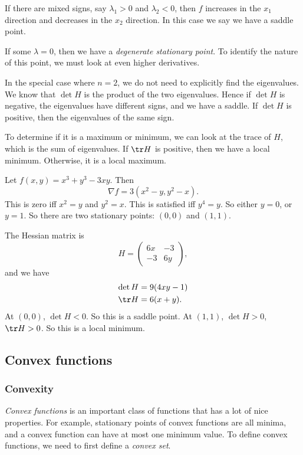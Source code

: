 \documentclass[a4paper]{article}
\begin{document}
If there are mixed signs, say $\lambda_1 > 0$ and $\lambda_2 < 0$, then $f$ increases in the $x_1$ direction and decreases in the $x_2$ direction. In this case we say we have a saddle point.

If some $\lambda = 0$, then we have a \emph{degenerate stationary point}. To identify the nature of this point, we must look at even higher derivatives.

In the special case where $n = 2$, we do not need to explicitly find the eigenvalues. We know that $\det H$ is the product of the two eigenvalues. Hence if $\det H$ is negative, the eigenvalues have different signs, and we have a saddle. If $\det H$ is positive, then the eigenvalues of the same sign.

To determine if it is a maximum or minimum, we can look at the trace of $H$, which is the sum of eigenvalues. If $\tr H$ is positive, then we have a local minimum. Otherwise, it is a local maximum.

\begin{eg}
  Let $f(x, y) = x^3 + y^3 - 3xy$. Then
  \[
    \nabla f = 3(x^2 - y, y^2 - x).
  \]
  This is zero iff $x^2 = y$ and $y^2 = x$. This is satisfied iff $y^4 = y$. So either $y = 0$, or $y = 1$. So there are two stationary points: $(0, 0)$ and $(1, 1)$.

  The Hessian matrix is
  \[
    H =
    \begin{pmatrix}
      6x & -3\\
      -3 & 6y
    \end{pmatrix},
  \]
  and we have
  \begin{align*}
    \det H &= 9(4xy - 1)\\
    \tr H &= 6(x + y).
  \end{align*}
  At $(0, 0)$, $\det H < 0$. So this is a saddle point. At $(1, 1)$, $\det H > 0$, $\tr H > 0$. So this is a local minimum.
\end{eg}
\subsection{Convex functions}
\subsubsection{Convexity}
\emph{Convex functions} is an important class of functions that has a lot of nice properties. For example, stationary points of convex functions are all minima, and a convex function can have at most one minimum value. To define convex functions, we need to first define a \emph{convex set}.
\end{document}
